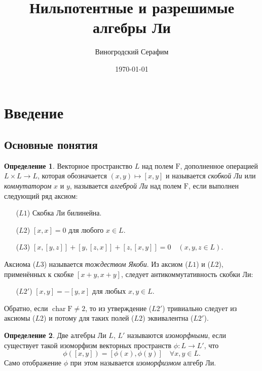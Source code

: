\documentclass[a4paper, 12pt]{article}
\title{Нильпотентные и разрешимые алгебры Ли}
\author{Виногродский Серафим}
\date{\today}
\theoremstyle{definition}
\newtheorem{definition}{Определение}[section]
\begin{document}
\maketitle
\tableofcontents
\thispagestyle{empty}
\pagebreak

\section{Введение}%
\label{sec:introduction}

\subsection{Основные понятия}%
\label{sec:lie_algebra_notion}

\begin{definition}
    \label{def:lie_algebra}
    Векторное пространство \( L \) над полем \( \mathrm F \), дополненное операцией \( L \times L \to L \), которая обозначается \( (x ,y) \mapsto [x, y] \) и называется \textit{скобкой Ли} или \textit{коммутатором} \( x \) и \( y \), называется \textit{алгеброй Ли} над полем \( \mathrm F \), если выполнен следующий ряд аксиом:
\begin{itemize}
    \item[(\( L 1 \))] Скобка Ли билинейна.
    \item[(\( L 2 \))] \( [x, x] = 0 \) для любого \( x \in L \).
    \item[(\( L 3 \))] \( [x, [y, z]] + [y, [z, x]] + [z, [x, y]] = 0 \quad (x, y, z \in L) \).
\end{itemize}
\end{definition}

Аксиома (\( L 3 \)) называется \textit{тождеством Якоби}.
Из аксиом (\( L 1 \)) и (\( L 2 \)), применённых к скобке \( [x + y, x + y] \), следует антикоммутативность скобки Ли:
\begin{itemize}
    \item[(\( L 2' \))] \( [x, y] = -[y, x] \) для любых \( x, y \in L \).
\end{itemize}
Обратно, если \( \operatorname{char} \mathrm F \neq 2 \), то из утверждение (\( L 2' \)) тривиально следует из аксиомы (\( L 2 \)) и потому для таких полей (\( L 2 \)) эквивалентна (\( L 2' \)).

\begin{definition}
    \label{def:isomorphous_algebras}
    Две алгебры Ли \( L \), \( L' \) называются \textit{изоморфными}, если существует такой изоморфизм векторных пространств \( \phi : L \to L' \), что
    \[
        \phi([x, y]) = [\phi(x), \phi(y)] \quad \forall x, y \in L.
    \]
    Само отображение \( \phi \) при этом называется \textit{изоморфизмом} алгебр Ли.
\end{definition}
\end{document}
